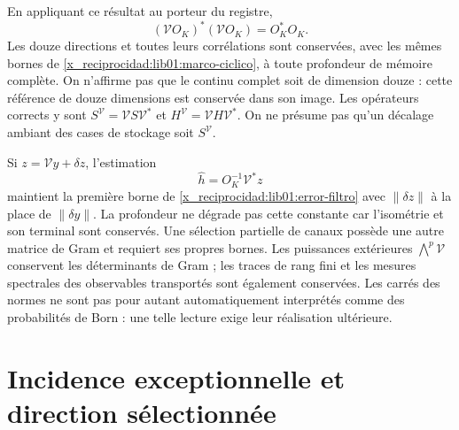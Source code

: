 En appliquant ce résultat au porteur du registre,
\begin{equation}
 (\mathcal VO_K)^*(\mathcal VO_K)=O_K^*O_K.
 \label{x_reciprocidad:lib01:gram-memoria}
\end{equation}
Les douze directions et toutes leurs corrélations sont conservées, avec les
mêmes bornes de \cref{x_reciprocidad:lib01:marco-ciclico}, à toute profondeur de
mémoire complète. On n’affirme pas que le continu complet soit de dimension
douze : cette référence de douze dimensions est conservée dans son image.
Les opérateurs corrects y sont
\(S^{\mathcal V}=\mathcal VS\mathcal V^*\) et
\(H^{\mathcal V}=\mathcal VH\mathcal V^*\). On ne présume pas qu’un
décalage ambiant des cases de stockage soit
\(S^{\mathcal V}\).

Si \(z=\mathcal Vy+\delta z\), l'estimation
\[
 \widehat h=O_K^{-1}\mathcal V^*z
\]
maintient la première borne de \eqref{x_reciprocidad:lib01:error-filtro} avec \(\|\delta z\|\) à la place de \(\|\delta y\|\). La profondeur ne dégrade pas cette constante car l'isométrie et son terminal sont conservés. Une sélection partielle de canaux possède une autre matrice de Gram et requiert ses propres bornes. Les puissances extérieures \(\bigwedge^p\mathcal V\) conservent les déterminants de Gram ; les traces de rang fini et les mesures spectrales des observables transportés sont également conservées. Les carrés des normes ne sont pas pour autant automatiquement interprétés comme des probabilités de Born : une telle lecture exige leur réalisation ultérieure.

\section{Incidence exceptionnelle et direction sélectionnée}
\label{x_reciprocidad:lib01:direccion}

